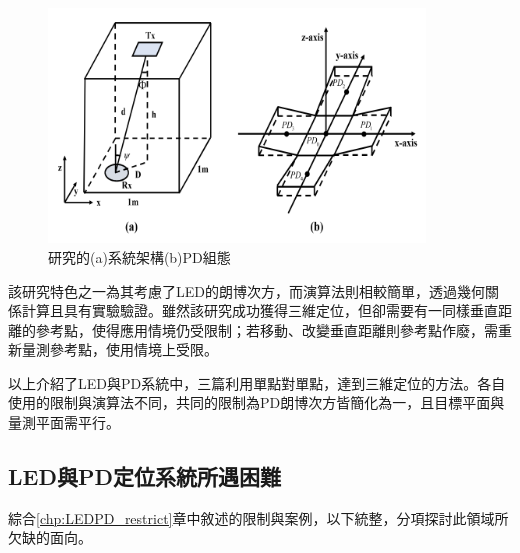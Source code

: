 \begin{description}
        \begin{figure}[h]
            \centering
            \includegraphics[width=10cm]{ch2pic/case_cart3d.png}
            \caption{\cite{case:cart3d}研究的(a)系統架構(b)PD組態}
            \label{pic:case_cart3d}
        \end{figure}

        該研究特色之一為其考慮了LED的朗博次方，而演算法則相較簡單，透過幾何關係計算且具有實驗驗證。雖然該研究成功獲得三維定位，但卻需要有一同樣垂直距離的參考點，使得應用情境仍受限制；若移動、改變垂直距離則參考點作廢，需重新量測參考點，使用情境上受限。

    \end{description}

    以上介紹了LED與PD系統中，三篇利用單點對單點，達到三維定位的方法。各自使用的限制與演算法不同，共同的限制為PD朗博次方皆簡化為一，且目標平面與量測平面需平行。







    \subsection{LED與PD定位系統所遇困難}
    \label{chp:LEDPD_problem}
        
    綜合\ref{chp:LEDPD_restrict}章中敘述的限制與案例，以下統整，分項探討此領域所欠缺的面向。
    
